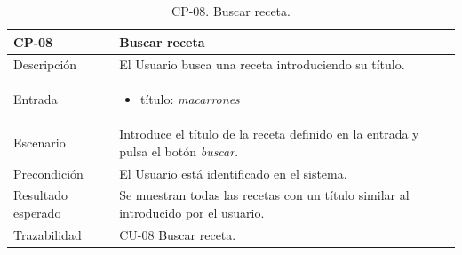     \begin{table}[H]
        \centering
        \begin{tabularx}{1\textwidth} { 
            | >{\raggedright\arraybackslash}X 
            | >{\raggedright\arraybackslash}X 
            | >{\raggedright\arraybackslash}X
            |  }
        \hline
        \textbf{CP-08}     & \textbf{Buscar receta}                             \\ \hline
        Descripción        & El Usuario busca una receta introduciendo su título.      \\ \hline
        Entrada            & \begin{itemize}
            \item título: \textit{macarrones}
        \end{itemize} \\ \hline
        Escenario          & Introduce el título de la receta definido en la entrada y pulsa el botón \textit{buscar}.                            \\ \hline
        Precondición          & El Usuario está identificado en el sistema.                             \\ \hline
        
        Resultado esperado & Se muestran todas las recetas con un título similar al introducido por el usuario. \\ \hline
        Trazabilidad & CU-08 Buscar receta. \\ \hline
    \end{tabularx}
    \caption{CP-08. Buscar receta.}
    \label{table:CP-08}
        \end{table}


